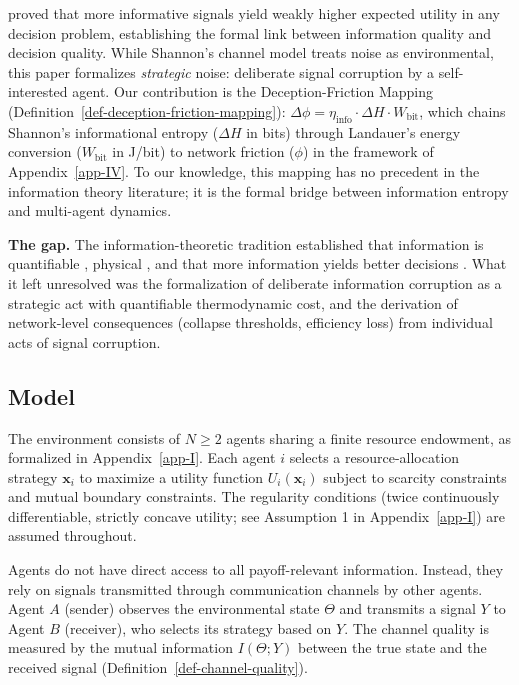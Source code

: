 \documentclass[11pt]{article}
\theoremstyle{plain}
\theoremstyle{definition}
\theoremstyle{remark}
\let\origsubsection\subsection
\renewcommand{\subsection}{\needspace{7\baselineskip}\origsubsection}
\begin{document}
\citet{Blackwell1953} proved that more informative signals yield weakly
higher expected utility in any decision problem, establishing the formal
link between information quality and decision quality. While Shannon's
channel model treats noise as environmental, this paper formalizes
\emph{strategic} noise: deliberate signal corruption by a
self-interested agent. Our contribution is the Deception-Friction
Mapping (Definition~\ref{def-deception-friction-mapping}):
\(\Delta\phi = \eta_{\text{info}} \cdot \Delta H \cdot W_{\text{bit}}\),
which chains Shannon's informational entropy (\(\Delta H\) in bits)
through Landauer's energy conversion (\(W_{\text{bit}}\) in J/bit) to
network friction (\(\phi\)) in the framework of Appendix~\ref{app-IV}.
To our knowledge, this mapping has no precedent in the information
theory literature; it is the formal bridge between information entropy
and multi-agent dynamics.

\textbf{The gap.} The information-theoretic tradition established that
information is quantifiable \citep{Shannon1948}, physical
\citep{Brillouin1962, Landauer1961}, and that more information yields
better decisions \citep{Blackwell1953}. What it left unresolved was the
formalization of deliberate information corruption as a strategic act
with quantifiable thermodynamic cost, and the derivation of
network-level consequences (collapse thresholds, efficiency loss) from
individual acts of signal corruption.

\subsection{Model}\label{model-1}

The environment consists of \(N \geq 2\) agents sharing a finite
resource endowment, as formalized in Appendix~\ref{app-I}. Each agent
\(i\) selects a resource-allocation strategy \(\mathbf{x}_i\) to
maximize a utility function \(U_i(\mathbf{x}_i)\) subject to scarcity
constraints and mutual boundary constraints. The regularity conditions
(twice continuously differentiable, strictly concave utility; see
Assumption 1 in Appendix~\ref{app-I}) are assumed throughout.

Agents do not have direct access to all payoff-relevant information.
Instead, they rely on signals transmitted through communication channels
by other agents. Agent \(A\) (sender) observes the environmental state
\(\Theta\) and transmits a signal \(Y\) to Agent \(B\) (receiver), who
selects its strategy based on \(Y\). The channel quality is measured by
the mutual information \(I(\Theta; Y)\) between the true state and the
received signal (Definition~\ref{def-channel-quality}).
\end{document}
